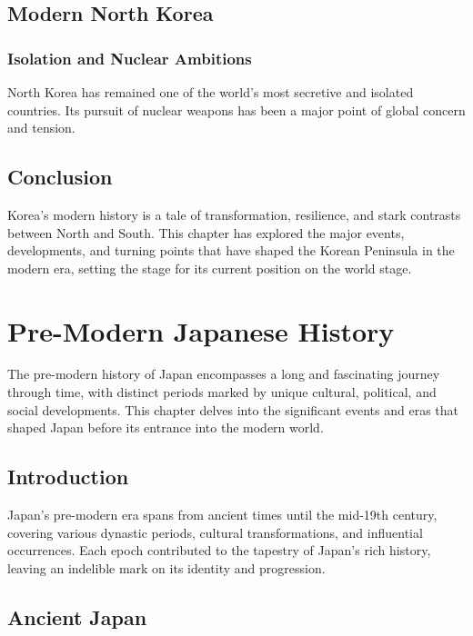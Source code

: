 \documentclass[a4paper,12pt]{book}
\begin{document}
\section{Modern North Korea}
\label{sec:modern-north-korea}

\subsection{Isolation and Nuclear Ambitions}
\label{subsec:isolation-nuclear-ambitions}
North Korea has remained one of the world’s most secretive and isolated countries. Its pursuit of nuclear weapons has been a major point of global concern and tension.

\section{Conclusion}
\label{sec:conclusion-modern-korea}
Korea’s modern history is a tale of transformation, resilience, and stark contrasts between North and South. This chapter has explored the major events, developments, and turning points that have shaped the Korean Peninsula in the modern era, setting the stage for its current position on the world stage.

\chapter{Pre-Modern Japanese History}
\label{ch:pre-modern-japanese-history}

The pre-modern history of Japan encompasses a long and fascinating journey through time, with distinct periods marked by unique cultural, political, and social developments. This chapter delves into the significant events and eras that shaped Japan before its entrance into the modern world.

\section{Introduction}
\label{sec:introduction-pre-modern-japan}
Japan's pre-modern era spans from ancient times until the mid-19th century, covering various dynastic periods, cultural transformations, and influential occurrences. Each epoch contributed to the tapestry of Japan's rich history, leaving an indelible mark on its identity and progression.

\section{Ancient Japan}
\label{sec:ancient-japan}
\end{document}
